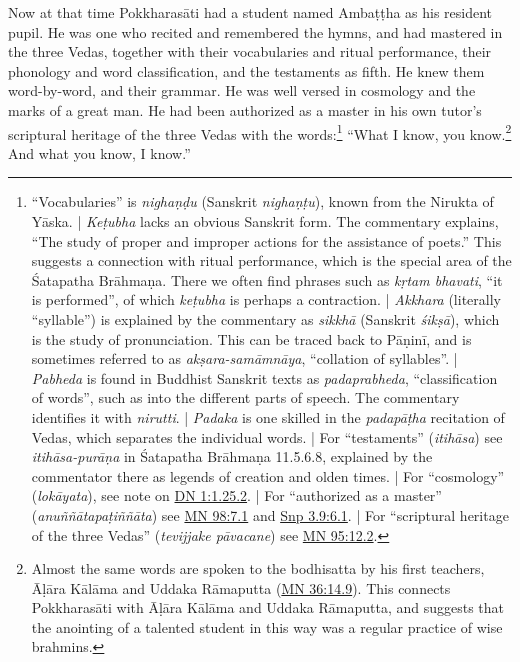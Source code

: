 \documentclass[12pt,openany]{book}%
\begin{document}
Now at that time \textsanskrit{Pokkharasāti} had a student named \textsanskrit{Ambaṭṭha} as his resident pupil. He was one who recited and remembered the hymns, and had mastered in the three Vedas, together with their vocabularies and ritual performance, their phonology and word classification, and the testaments as fifth. He knew them word-by-word, and their grammar. He was well versed in cosmology and the marks of a great man. He had been authorized as a master in his own tutor’s scriptural heritage of the three Vedas with the words:\footnote{“Vocabularies” is \textit{\textsanskrit{nighaṇḍu}} (Sanskrit \textit{\textsanskrit{nighaṇṭu}}), known from the Nirukta of \textsanskrit{Yāska}. | \textit{\textsanskrit{Keṭubha}} lacks an obvious Sanskrit form. The commentary explains, “The study of proper and improper actions for the assistance of poets.” This suggests a connection with ritual performance, which is the special area of the Śatapatha \textsanskrit{Brāhmaṇa}. There we often find phrases such as \textit{\textsanskrit{kṛtam} bhavati}, “it is performed”, of which \textit{\textsanskrit{keṭubha}} is perhaps a contraction. | \textit{Akkhara} (literally “syllable”) is explained by the commentary as \textit{\textsanskrit{sikkhā}} (Sanskrit \textit{\textsanskrit{śikṣā}}), which is the study of pronunciation. This can be traced back to \textsanskrit{Pāṇinī}, and is sometimes referred to as \textit{\textsanskrit{akṣara}-\textsanskrit{samāmnāya}}, “collation of syllables”. | \textit{Pabheda} is found in Buddhist Sanskrit texts as \textit{padaprabheda}, “classification of words”, such as into the different parts of speech. The commentary identifies it with \textit{nirutti}. | \textit{Padaka} is one skilled in the \textit{\textsanskrit{padapāṭha}} recitation of Vedas, which separates the individual words. | For “testaments” (\textit{\textsanskrit{itihāsa}}) see \textit{\textsanskrit{itihāsa}-\textsanskrit{purāṇa}} in Śatapatha \textsanskrit{Brāhmaṇa} 11.5.6.8, explained by the commentator there as legends of creation and olden times. | For “cosmology” (\textit{\textsanskrit{lokāyata}}), see note on \href{https://suttacentral.net/dn1/en/sujato\#1.25.2}{DN 1:1.25.2}. | For “authorized as a master” (\textit{\textsanskrit{anuññātapaṭiññāta}}) see \href{https://suttacentral.net/mn98/en/sujato\#7.1}{MN 98:7.1} and \href{https://suttacentral.net/snp3.9/en/sujato\#6.1}{Snp 3.9:6.1}. | For “scriptural heritage of the three Vedas” (\textit{tevijjake \textsanskrit{pāvacane}}) see \href{https://suttacentral.net/mn95/en/sujato\#12.2}{MN 95:12.2}. } “What I know, you know.\footnote{Almost the same words are spoken to the bodhisatta by his first teachers, \textsanskrit{Āḷāra} \textsanskrit{Kālāma} and Uddaka \textsanskrit{Rāmaputta} (\href{https://suttacentral.net/mn36/en/sujato\#14.9}{MN 36:14.9}). This connects \textsanskrit{Pokkharasāti} with \textsanskrit{Āḷāra} \textsanskrit{Kālāma} and Uddaka \textsanskrit{Rāmaputta}, and suggests that the anointing of a talented student in this way was a regular practice of wise brahmins. } And what you know, I know.” 
\end{document}
